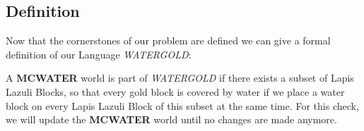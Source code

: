 \subsection{Definition}

Now that the cornerstones of our problem are defined we can give a formal definition of our Language \textit{WATERGOLD}:

A \textbf{MCWATER} world is part of \textit{WATERGOLD} if there exists a subset of Lapis Lazuli Blocks, so that every gold block is covered by water if we place a water block on every Lapis Lazuli Block of this subset at the same time. For this check, we will update the \textbf{MCWATER} world until no changes are made anymore.



